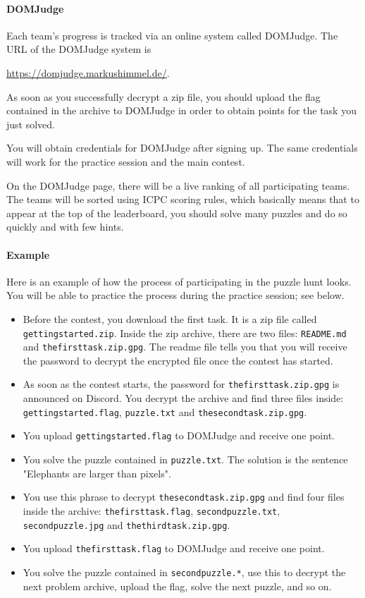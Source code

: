 \documentclass[fontsize=10pt,a4paper,DIV=12,parskip=half]{scrarticle}
\begin{document}
\paragraph{DOMJudge}
Each team's progress is tracked via an online system called DOMJudge. The URL of
the DOMJudge system is
\begin{center}
	\url{https://domjudge.markushimmel.de/}.
\end{center}

As soon as you successfully decrypt a zip file, you should upload the flag
contained in the archive to DOMJudge in order to obtain points for the task you
just solved.

You will obtain credentials for DOMJudge after signing up. The same credentials
will work for the practice session and the main contest.

On the DOMJudge page, there will be a live ranking of all participating teams.
The teams will be sorted using ICPC scoring rules, which basically means that
to appear at the top of the leaderboard, you should solve many puzzles and do
so quickly and with few hints.

\paragraph{Example}
Here is an example of how the process of participating in the puzzle hunt looks.
You will be able to practice the process during the practice session; see below.

\begin{itemize}
	\item Before the contest, you download the first task. It is a zip file called
		\texttt{gettingstarted.zip}. Inside the zip archive, there are two files:
		\texttt{README.md} and \texttt{thefirsttask.zip.gpg}. The readme file tells
		you that you will receive the password to decrypt the encrypted file once
		the contest has started.
	\item As soon as the contest starts, the password for \texttt{thefirsttask.zip.gpg}
		is announced on Discord. You decrypt the archive and find three files inside:
		\texttt{gettingstarted.flag}, \texttt{puzzle.txt} and \texttt{thesecondtask.zip.gpg}.
	\item You upload \texttt{gettingstarted.flag} to DOMJudge and receive one point.
	\item You solve the puzzle contained in \texttt{puzzle.txt}. The solution is the
		sentence "Elephants are larger than pixels".
	\item You use this phrase to decrypt \texttt{thesecondtask.zip.gpg} and find
		four files inside the archive: \texttt{thefirsttask.flag}, \texttt{secondpuzzle.txt},
		\texttt{secondpuzzle.jpg} and \texttt{thethirdtask.zip.gpg}.
	\item You upload \texttt{thefirsttask.flag} to DOMJudge and receive one point.
	\item You solve the puzzle contained in \texttt{secondpuzzle.*}, use this to decrypt the
		next problem archive, upload the flag, solve the next puzzle, and so on.
\end{itemize}
\end{document}

